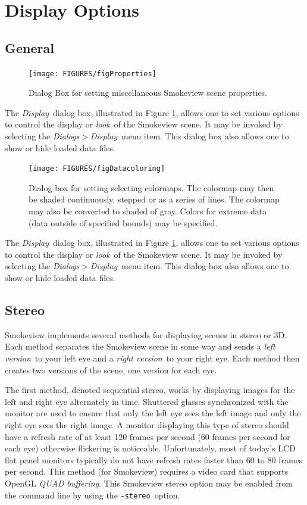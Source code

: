 \documentclass[11pt,twoside]{book}
\begin{document}
\section{Display Options}
\subsection{General}
\begin{figure}[\figoptions]
\centerline{\texttt{[image: FIGURES/figProperties]}
} \caption [Dialog Box for setting miscellaneous Smokeview scene
properties.] {Dialog Box for setting miscellaneous Smokeview scene
properties.} \label{figProperties}
\end{figure}
The {\em Display}\ dialog box, illustrated in Figure
\ref{figProperties}, allows one to set various options to control
the display or {\em look}\ of the Smokeview scene.  It may be
invoked by selecting the {\em Dialogs$>$Display}\ menu item. This
dialog box also allows one to show or hide loaded data files.

\begin{figure}[\figoptions]
\centerline{\texttt{[image: FIGURES/figDatacoloring]}
} \caption [Dialog Box for setting selecting colormaps.] {Dialog
box for setting selecting colormaps.  The colormap may then be
shaded continuously, stepped or as a series of lines.  The
colormap may also be converted to shaded of gray.  Colors for
extreme data (data outside of specified bounds) may be specified.}
\label{figDatacoloring}
\end{figure}

The {\em Display}\ dialog box, illustrated in Figure
\ref{figProperties}, allows one to set various options to control
the display or {\em look}\ of the Smokeview scene.  It may be
invoked by selecting the {\em Dialogs$>$Display}\ menu item. This
dialog box also allows one to show or hide loaded data files.

\subsection{Stereo}
Smokeview implements several methods for displaying scenes in
stereo or 3D.  Each method separates the Smokeview scene in some
way and sends a {\em left version}\ to your left eye and a {\em
right version}\ to your right eye. Each method then creates two
versions of the scene, one version for each eye.

The first method, denoted sequential stereo, works by displaying
images for the left and right eye alternately in time.  Shuttered
glasses  synchronized with the monitor are used to ensure that
only the left eye sees the left image and only the right eye sees
the right image.  A monitor displaying this type of stereo should
have a refresh rate of at least 120 frames per second (60 frames
per second for each eye) otherwise flickering is noticeable.
Unfortunately, most of today's LCD flat panel monitors typically
do not have refresh rates faster than 60 to 80 frames per second.
This method (for Smokeview) requires a video card that supports
OpenGL {\em QUAD buffering}. This Smokeview stereo option may be
enabled from the command line by using the {\tt -stereo}\ option.
\end{document}
